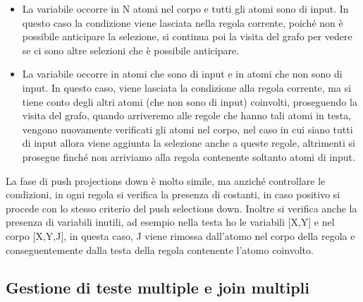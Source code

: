 \begin{itemize}
	\item La variabile occorre in N atomi nel corpo e tutti gli atomi sono di input. In questo caso la condizione viene lasciata nella regola corrente, poiché non è possibile anticipare la selezione, si continua poi la visita del grafo per vedere se ci sono altre selezioni che è possibile anticipare.
	\item La variabile occorre in atomi che sono di input e in atomi che non sono di input. In questo caso, viene lasciata la condizione alla regola corrente, ma si tiene conto degli altri atomi (che non sono di input) coinvolti, proseguendo la visita del grafo, quando arriveremo alle regole che hanno tali atomi in testa, vengono nuovamente verificati gli atomi nel corpo, nel caso in cui siano tutti di input allora viene aggiunta la selezione anche a queste regole, altrimenti si prosegue finché non arriviamo alla regola contenente soltanto atomi di input.
\end{itemize}
La fase di push projections down è molto simile, ma anziché controllare le condizioni, in ogni regola si verifica la presenza di costanti, in caso positivo si procede con lo stesso criterio del push selections down. Inoltre si verifica anche la presenza di variabili inutili, ad esempio nella testa ho le variabili [X,Y] e nel corpo [X,Y,J], in questa caso, J viene rimossa dall'atomo nel corpo della regola e conseguentemente dalla testa della regola contenente l'atomo coinvolto.

\subsection{Gestione di teste multiple e join multipli}

